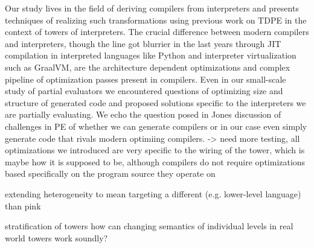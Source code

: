\documentclass{article}
\theoremstyle{definition}
\begin{document}

Our study lives in the field of deriving compilers from interpreters and presents techniques of realizing such transformations using previous work on TDPE in the context of towers of interpreters. The crucial difference between modern compilers and interpreters, though the line got blurrier in the last years through JIT compilation in interpreted languages like Python and interpreter virtualization such as GraalVM, are the architecture dependent optimizations and complex pipeline of optimization passes present in compilers. Even in our small-scale study of partial evaluators we encountered questions of optimizing size and structure of generated code and proposed solutions specific to the interpreters we are partially evaluating. We echo the question posed in Jones \cite{jones1988challenging} discussion of challenges in PE of whether we can generate compilers or in our case even simply generate code that rivals modern optimiing compilers. -> need more testing, all optimizations we introduced are very specific to the wiring of the tower, which is maybe how it is supposed to be, although compilers do not require optimizations based specifically on the program source they operate on

extending heterogeneity to mean targeting a different (e.g. lower-level language) than pink

stratification of towers
how can changing semantics of individual levels in real world towers work soundly?



\end{document}

